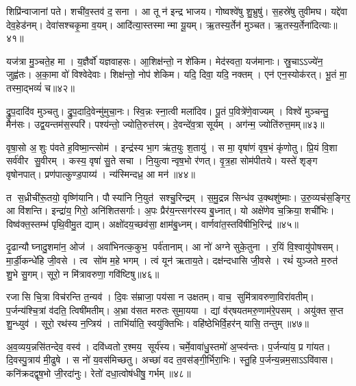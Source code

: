 शिप्रि॑न्वाजानां पते।
शची॑व॒स्तव॑ द॒सना।
आ तू न॑ इन्द्र भाजय।
गोष्वश्वे॑षु शु॒भ्रुषु॑।
स॒हस्रे॑षु तुवीमघ।
यद्दे॑वा देव॒हेड॑नम्।
देवा॑सश्चकृ॒मा व॒यम्।
आदि॑त्या॒स्तस्मान्मा यू॒यम्।
ऋ॒तस्य॒र्तेन॑ मुञ्चत।
ऋ॒तस्य॒र्तेना॑दित्याः॥४१॥

यज॑त्रा मु॒ञ्चते॒ह मा।
य॒ज्ञैर्वो॑ यज्ञवाहसः।
आ॒शिक्ष॑न्तो॒ न शे॑किम।
मेद॑स्वता॒ यज॑मानाः।
स्रु॒चाऽऽज्ये॑न॒ जुह्व॑तः।
अ॒का॒मा वो॑ विश्वेदेवाः।
शिक्ष॑न्तो॒ नोप॑ शेकिम।
यदि॒ दिवा॒ यदि॒ नक्तम्।
एन॑ एन॒स्योक॑रत्।
भू॒तं मा॒ तस्मा॒द्भव्यं॑ च॥४२॥

द्रु॒प॒दादि॑व मुञ्चतु।
द्रु॒प॒दादि॒वेन्मु॑मुचा॒नः।
स्वि॒न्नः स्ना॒त्वी मला॑दिव।
पू॒तं प॒वित्रे॑णे॒वाज्यम्।
विश्वे॑ मुञ्चन्तु॒ मैन॑सः।
उद्व॒यन्तम॑स॒स्परि॑।
पश्य॑न्तो॒ ज्योति॒रुत्त॑रम्।
दे॒वन्दे॑व॒त्रा सूर्यम्।
अग॑न्म॒ ज्योति॑रुत्त॒मम्॥४३॥\anuvakamend[तव॑ कृधि॒ वन॒स्पतीञ्जानता॒मस॑ति व॒यं भ॑रादित्याश्च॒ नव॑ च]

वृषा॒सो अ॒शुः प॑वते ह॒विष्मा॒न्त्सोम॑।
इन्द्र॑स्य भा॒ग ऋ॑त॒युः श॒तायु॑।
स मा॒ वृषा॑णं वृष॒भं कृ॑णोतु।
प्रि॒यं वि॒शा सर्व॑वीर सु॒वीरम्।
कस्य॒ वृषा॑ सु॒ते सचा।
नि॒युत्वान्वृष॒भो र॑णत्।
वृ॒त्र॒हा सोम॑पीतये।
यस्ते॑ शृङ्ग वृषोनपात्।
प्रण॑पात्कुण्ड॒पाय्य॑।
न्य॑स्मिन्दध्र॒ आ मन॑॥४४॥

त स॒ध्रीची॑रू॒तयो॒ वृष्णि॑यानि।
पौस्या॑नि नि॒युत॑ सश्चु॒रिन्द्रम्।
स॒मु॒द्रन्न सिन्ध॑व उ॒क्थशु॑ष्माः।
उ॒रु॒व्यच॑स॒ङ्गिर॒ आ वि॑शन्ति।
इन्द्रा॑य॒ गिरो॒ अनि॑शितसर्गाः।
अ॒पः प्रैर॑य॒न्त्सग॑रस्य बु॒ध्नात्।
यो अक्षे॑णेव च॒क्रिया॒ शची॑भिः।
विष्व॑क्त॒स्तम्भ॑ पृथि॒वीमु॒त द्याम्।
अक्षो॑दय॒च्छव॑सा॒ क्षाम॑बु॒ध्नम्।
वार्णवा॑त॒स्तवि॑षीभि॒रिन्द्र॑॥४५॥

दृ॒ढान्यौघ्नादु॒शमा॑न॒ ओज॑।
अवा॑भिनत्क॒कुभ॒ पर्व॑तानाम्।
आ नो॑ अग्ने सुके॒तुना।
र॒यिं वि॒श्वायु॑पोषसम्।
मा॒र्डी॒कन्धे॑हि जी॒वसे।
त्व सो॑म म॒हे भगम्।
त्वं यून॑ ऋताय॒ते।
दक्ष॑न्दधासि जी॒वसे।
रथं॑ युञ्जते म॒रुत॑ शु॒भे सु॒गम्।
सूरो॒ न मि॑त्रावरुणा॒ गवि॑ष्टिषु॥४६॥

रजासि चि॒त्रा विच॑रन्ति त॒न्यव॑।
दि॒वः स॑म्राजा॒ पय॑सा न उक्षतम्।
वाच॒ सुमि॑त्रावरुणा॒विरा॑वतीम्।
प॒र्जन्य॑श्चि॒त्रां व॑दति॒ त्विषी॑मतीम्।
अ॒भ्रा व॑सत मरुतः सुमा॒यया।
द्यां व॑र्‌षयतमरु॒णाम॑रे॒पसम्।
अयु॑क्त स॒प्त शु॒न्ध्युव॑।
सूरो॒ रथ॑स्य न॒प्त्रिय॑।
ताभि॑र्याति॒ स्वयु॑क्तिभिः।
वहि॑ष्ठेभिर्\mbox{}वि॒हर॑न् यासि॒ तन्तुम्॥४७॥

अ॒व॒व्यय॒न्नसि॑तन्देव॒ वस्व॑।
दवि॑ध्वतो र॒श्मय॒ सूर्य॑स्य।
चर्मे॒वावा॑धु॒स्तमो॑ अ॒प्स्व॑न्तः।
प॒र्जन्या॑य॒ प्र गा॑यत।
दि॒वस्पु॒त्राय॑ मी॒ढुषे।
स नो॑ य॒वस॑मिच्छतु।
अच्छा॑ वद त॒वस॑ङ्गी॒र्भिरा॒भिः।
स्तु॒हि प॒र्जन्य॒न्नम॒साऽऽवि॑वास।
कनि॑क्रदद्वृष॒भो जी॒रदा॑नुः।
रेतो॑ दधा॒त्वोष॑धीषु॒ गर्भम्॥४८॥

